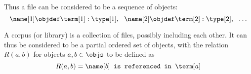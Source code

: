 Thus a \coq file can be considered to be a sequence of \coq objects:
$$ \name[1] \objdef \term[1] : \type[1], ~~ \name[2] \objdef \term[2] : \type[2], ~~ \ldots $$

A \coq corpus (or library) is a collection of \coq files, possibly including each other.
It can thus be considered to be a partial ordered set of \coq objects, with the relation $R(a,b)$ for \coq objects $a, b \in \objs$ to be defined as
\[R(a,b) = \name[b] \texttt{~is referenced in~} \term[a]\]
